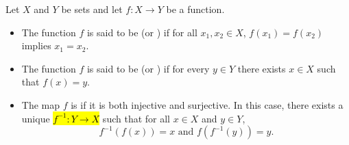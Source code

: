 \begin{definition} \label{definition:injective_surjective_bijective_map_of_sets}
Let $X$ and $Y$ be sets and let $f: X \to Y$ be a function.
\begin{itemize}
  \item The function $f$ is said to be  (or ) if for all $x_1, x_2 \in X$, $f(x_1) = f(x_2)$ implies $x_1 = x_2$.
  \item The function $f$ is said to be  (or ) if for every $y \in Y$ there exists $x \in X$ such that $f(x) = y$.

  \item The map $f$ is  if it is both injective and surjective. In this case, there exists a unique  \hl{$f^{-1} : Y \to X$} such that for all $x \in X$ and $y \in Y$,
    $$f^{-1}(f(x)) = x \text{ and } f(f^{-1}(y)) = y.$$
\end{itemize}
\end{definition}